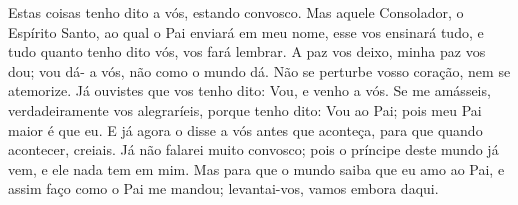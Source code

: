 {Estas coisas tenho dito a vós, estando
{} convosco.
Mas aquele Consolador, o Espírito Santo, ao qual o Pai enviará em meu nome, esse vos ensinará tudo, e tudo quanto tenho dito vós,
{} vos fará lembrar.
A paz vos deixo, minha paz vos dou; vou dá-
{} a vós, não como o mundo
{} dá. Não se perturbe vosso coração, nem se atemorize.
Já ouvistes que vos tenho dito: Vou, e venho a vós. Se me amásseis, verdadeiramente vos alegraríeis, porque tenho dito: Vou ao Pai; pois meu Pai maior é que eu.
E já agora o disse a vós antes que aconteça, para que quando acontecer,
{} creiais.
Já não falarei muito convosco; pois o príncipe deste mundo já vem, e ele nada tem em mim.
Mas para que o mundo saiba que eu amo ao Pai, e assim faço como o Pai me mandou; levantai-vos, vamos embora daqui.

}
